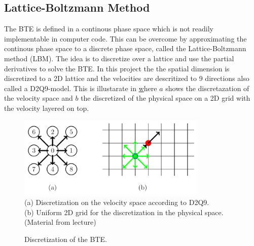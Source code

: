 \documentclass[a4paper,11pt]{article}
\begin{document}
\subsection{Lattice-Boltzmann Method} \label{sec:lbm}
The BTE is defined in a continous phase space which is not readily implementable in computer code.
This can be overcome by approximating the continous phase space to a discrete phase space, called the Lattice-Boltzmann method (LBM).
The idea is to discretize over a lattice and use the partial derivatives to solve the BTE.
In this project the the spatial dimension is discretized to a 2D lattice and the velocities are descritized to 9 directions also called a D2Q9-model.
This is illustarate in \href{fig:d2q9-scheme} where $a$ shows the discretazation of the velocity space and $b$ the discretized of the physical space on a 2D grid with the velocity layered on top.
\begin{figure}[h]
  \caption{Discretization of the BTE.}
  \label{fig:d2q9-scheme}
  \centering
  \includegraphics[width=9cm]{d2q9_scheme.png}\\
  (a) Discretization on the velocity space according to D2Q9.\\
  (b) Uniform 2D grid for the discretization in the physical space.\\
  \small{(Material from lecture)}
\end{figure}
\end{document}
